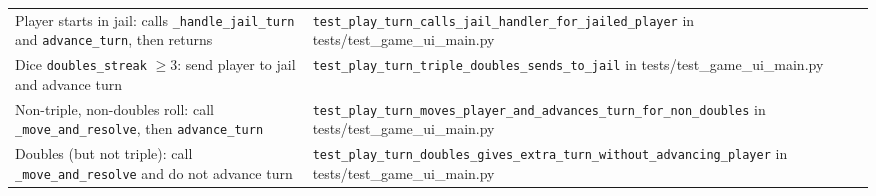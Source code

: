 \documentclass[11pt]{article}
\begin{document}
\begin{longtable}{>{\raggedright\arraybackslash}p{} >{\raggedright\arraybackslash}p{}}
\multicolumn{2}{l}{\textbf{moneypoly.game: play\_turn}} \\ \hline
Player starts in jail: calls \texttt{\_handle\_jail\_turn} and \texttt{advance\_turn}, then returns & \texttt{test\_play\_turn\_calls\_jail\_handler\_for\_jailed\_player} in tests/test\_game\_ui\_main.py \\ \hline
Dice \texttt{doubles\_streak} $\geq 3$: send player to jail and advance turn & \texttt{test\_play\_turn\_triple\_doubles\_sends\_to\_jail} in tests/test\_game\_ui\_main.py \\ \hline
Non-triple, non-doubles roll: call \texttt{\_move\_and\_resolve}, then \texttt{advance\_turn} & \texttt{test\_play\_turn\_moves\_player\_and\_advances\_turn\_for\_non\_doubles} in tests/test\_game\_ui\_main.py \\ \hline
Doubles (but not triple): call \texttt{\_move\_and\_resolve} and do not advance turn & \texttt{test\_play\_turn\_doubles\_gives\_extra\_turn\_without\_advancing\_player} in tests/test\_game\_ui\_main.py \\ \hline


\end{longtable}
\end{document}
